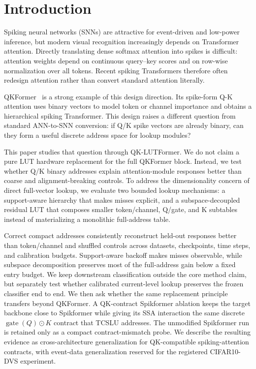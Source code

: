 \section{Introduction}
\label{sec:intro}

Spiking neural networks (SNNs) are attractive for event-driven and low-power
inference, but modern visual recognition increasingly depends on Transformer
attention. Directly translating dense softmax attention into spikes is
difficult: attention weights depend on continuous query--key scores and on
row-wise normalization over all tokens. Recent spiking Transformers therefore
often redesign attention rather than convert standard attention literally.

QKFormer~\cite{zhou2024qkformer} is a strong example of this design direction.
Its spike-form Q-K attention uses binary vectors to model token or channel
importance and obtains a hierarchical spiking Transformer. This design raises a
different question from standard ANN-to-SNN conversion: if Q/K spike vectors
are already binary, can they form a useful discrete address space for lookup
modules?

This paper studies that question through QK-LUTFormer. We do not claim a pure
LUT hardware replacement for the full QKFormer block. Instead, we test whether
Q/K binary addresses explain attention-module responses better than coarse and
alignment-breaking controls. To address the dimensionality concern of direct
full-vector lookup, we evaluate two bounded lookup mechanisms: a support-aware
hierarchy that makes misses explicit, and a subspace-decoupled residual LUT
that composes smaller token/channel, Q/gate, and K subtables instead of
materializing a monolithic full-address table.

Correct compact addresses consistently reconstruct held-out responses better
than token/channel and shuffled controls across datasets, checkpoints, time
steps, and calibration budgets. Support-aware backoff makes misses observable,
while subspace decomposition preserves most of the full-address gain below a
fixed entry budget. We keep downstream classification outside the core method
claim, but separately test whether calibrated current-level lookup preserves
the frozen classifier end to end. We then ask whether the same replacement
principle transfers beyond QKFormer. A QK-contract Spikformer ablation keeps
the target backbone close to Spikformer while giving its SSA interaction the
same discrete $\operatorname{gate}(Q)\odot K$ contract that TCSLU addresses.
The unmodified Spikformer run is retained only as a compact contract-mismatch
probe. We describe the resulting evidence as cross-architecture
generalization for QK-compatible spiking-attention contracts, with event-data
generalization reserved for the registered CIFAR10-DVS experiment.

